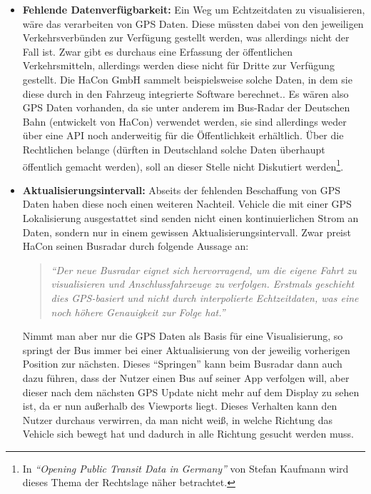     \begin{itemize}
      \item \textbf{Fehlende Datenverfügbarkeit:}
        Ein Weg um Echtzeitdaten zu visualisieren, wäre das verarbeiten von GPS Daten. Diese müssten dabei von den jeweiligen Verkehrsverbünden zur Verfügung gestellt werden, was allerdings nicht der Fall ist. Zwar gibt es durchaus eine Erfassung der öffentlichen Verkehrsmitteln, allerdings werden diese nicht für Dritte zur Verfügung gestellt. Die HaCon GmbH sammelt beispielsweise solche Daten, in dem sie diese durch in den Fahrzeug integrierte Software berechnet.\parencite{havasBusradar}. Es wären also GPS Daten vorhanden, da sie unter anderem im Bus-Radar der Deutschen Bahn (entwickelt von HaCon) verwendet werden, sie sind allerdings weder über eine API noch anderweitig für die Öffentlichkeit erhältlich. Über die Rechtlichen belange (dürften in Deutschland solche Daten überhaupt öffentlich gemacht werden), soll an dieser Stelle nicht Diskutiert werden\footnote{In \textit{"`Opening Public Transit Data in Germany"'} von Stefan Kaufmann\parencite{kaufmann} wird dieses Thema der Rechtslage näher betrachtet.}.

      \item \textbf{Aktualisierungsintervall:}
        Abseits der fehlenden Beschaffung von GPS Daten haben diese noch einen weiteren Nachteil. Vehicle die mit einer GPS Lokalisierung ausgestattet sind senden nicht einen kontinuierlichen Strom an Daten, sondern nur in einem gewissen Aktualisierungsintervall. Zwar preist HaCon seinen Busradar durch folgende Aussage an: 

        \begin{quote}
          \textit{"`Der neue Busradar eignet sich hervorragend, um die eigene Fahrt zu visualisieren und Anschlussfahrzeuge zu verfolgen. Erstmals geschieht dies GPS-basiert und nicht durch interpolierte Echtzeitdaten, was eine noch höhere Genauigkeit zur Folge hat."'}\parencite{havasBusradar}
        \end{quote}

        Nimmt man aber nur die GPS Daten als Basis für eine Visualisierung, so springt der Bus immer bei einer Aktualisierung von der jeweilig vorherigen Position zur nächsten. Dieses "`Springen"' kann beim Busradar dann auch dazu führen, dass der Nutzer einen Bus auf seiner App verfolgen will, aber dieser nach dem nächsten GPS Update nicht mehr auf dem Display zu sehen ist, da er nun außerhalb des Viewports liegt. Dieses Verhalten kann den Nutzer durchaus verwirren, da man nicht weiß, in welche Richtung das Vehicle sich bewegt hat und dadurch in alle Richtung gesucht werden muss.


\end{itemize}
